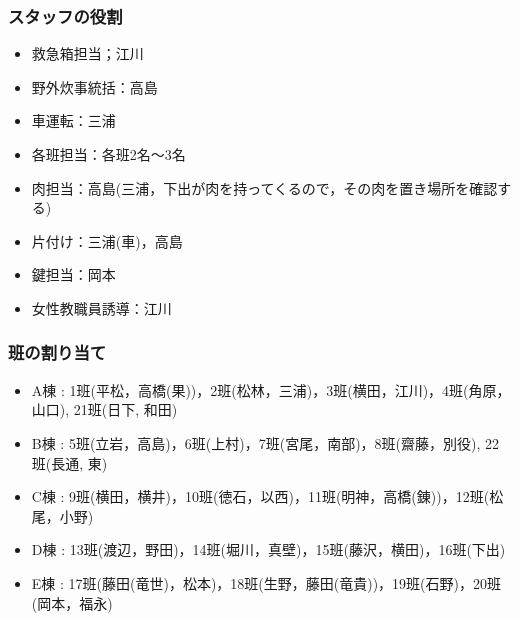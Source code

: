 \subsubsection{スタッフの役割}
\begin{itemize}
  \item 救急箱担当；江川
  \item 野外炊事統括：高島
  \item 車運転：三浦
  \item 各班担当：各班2名〜3名
  \item 肉担当：高島(三浦，下出が肉を持ってくるので，その肉を置き場所を確認する)
　\item 片付け：三浦(車)，高島
  \item 鍵担当：岡本
  \item 女性教職員誘導：江川
\end{itemize}

\subsubsection{班の割り当て}
\begin{itemize}
 \item A棟 : 1班(平松，高橋(果))，2班(松林，三浦)，3班(横田，江川)，4班(角原，山口), 21班(日下, 和田)
 \item B棟 : 5班(立岩，高島)，6班(上村)，7班(宮尾，南部)，8班(齋藤，別役), 22班(長通, 東)
 \item C棟 : 9班(横田，横井)，10班(徳石，以西)，11班(明神，高橋(錬))，12班(松尾，小野)
 \item D棟 : 13班(渡辺，野田)，14班(堀川，真壁)，15班(藤沢，横田)，16班(下出)
 \item E棟 : 17班(藤田(竜世)，松本)，18班(生野，藤田(竜貴))，19班(石野)，20班(岡本，福永)
\end{itemize}

